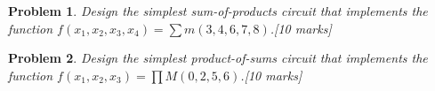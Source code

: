 \documentclass{article}
\newtheorem{prob}{Problem}
\begin{document}
\begin{prob}
Design the simplest sum-of-products circuit that implements the function $f (x_1
, x_2 , x_3, x_4 ) = \sum m(3, 4, 6, 7, 8)$.[10 marks]
\end{prob}

\begin{prob}
Design the simplest product-of-sums circuit that implements the function $f (x_1 , x_2 , x_3 ) = \prod M (0, 2, 5, 6)$.[10 marks]
\end{prob}


%
%
\end{document}
